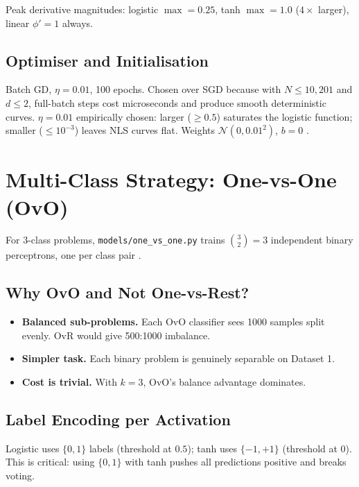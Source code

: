 \documentclass[11pt,a4paper]{article}
\newcommand{\code}[1]{\texttt{\small #1}}
\begin{document}
Peak derivative magnitudes: logistic $\max = 0.25$, tanh $\max = 1.0$ ($4\times$ larger),
linear $\phi' = 1$ always.

\subsection{Optimiser and Initialisation}

Batch GD, $\eta = 0.01$, 100 epochs. Chosen over SGD because with $N \le 10{,}201$ and
$d \le 2$, full-batch steps cost microseconds and produce smooth deterministic curves.
$\eta = 0.01$ empirically chosen: larger ($\ge 0.5$) saturates the logistic function; smaller ($\le 10^{-3}$)
leaves NLS curves flat. Weights $\mathcal{N}(0, 0.01^2)$, $b=0$ \cite{lecun1998efficient}.

\section{Multi-Class Strategy: One-vs-One (OvO)}

For 3-class problems, \code{models/one\_vs\_one.py} trains $\binom{3}{2}=3$ independent
binary perceptrons, one per class pair \cite{hastie1998pairwise}.

\subsection{Why OvO and Not One-vs-Rest?}
\begin{itemize}
\item \textbf{Balanced sub-problems.} Each OvO classifier sees 1000 samples split evenly.
OvR would give 500:1000 imbalance.
\item \textbf{Simpler task.} Each binary problem is genuinely separable on Dataset 1.
\item \textbf{Cost is trivial.} With $k=3$, OvO's balance advantage dominates.
\end{itemize}

\subsection{Label Encoding per Activation}

Logistic uses $\{0,1\}$ labels (threshold at $0.5$); tanh uses $\{-1,+1\}$ (threshold at $0$).
This is critical: using $\{0,1\}$ with tanh pushes all predictions positive and breaks voting.
\end{document}

